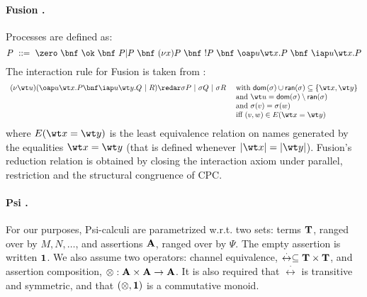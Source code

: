 \documentclass{LMCS}
\begin{document}
\paragraph{Fusion \cite{parrow.victor:fusion-calculus}.}
Processes are defined as:
$$
P\ ::=\ \zero\ \bnf\ \ok \ \bnf \ P|P\ \bnf \ (\nu x)P\ \bnf \ !P\ \bnf \ 
\oap u {\wt x}.P\ \bnf \ \iap u {\wt x}.P 
$$
The interaction rule for Fusion is taken from \cite{WG:explicit-fusions}:
$$
\begin{array}{ll}
(\nu \wt u)(\oap u {\wt x}.P\bnf \iap u {\wt y}.Q\ | \ R)
\redar \sigma P\ | \ \sigma Q\ | \ \sigma R\ 
& \mbox{with } {\sf dom}(\sigma) \cup {\sf ran}(\sigma) \subseteq \{\wt x,\wt y\}
\\
& \mbox{and } \wt u = {\sf dom}(\sigma) \setminus {\sf ran}(\sigma)
\\
& \mbox{and } \sigma(v) = \sigma(w)
\\
& \mbox{iff } (v,w) \in E(\wt x = \wt y)
\end{array}
$$
where $E(\wt x = \wt y)$ is the least equivalence relation on names
generated by the equalities $\wt x = \wt y$ (that is defined 
whenever $|\wt x| = |\wt y|$).
Fusion's reduction relation is obtained by closing the interaction axiom
under parallel, restriction and the structural congruence of CPC.

\newcommand{\cheq}{\stackrel\cdot\leftrightarrow}
\newcommand{\terms}{{\bf T}}
\newcommand{\assertion}{{\bf A}}
\newcommand{\one}{{\bf 1}}
\newcommand{\compose}{\otimes}
\newcommand{\assert}[1]{\llparenthesis \, #1 \, \rrparenthesis}
\newcommand{\fram}[1]{{\cal F}(#1)}

\paragraph{Psi \cite{BJPV11}.}
For our purposes, Psi-calculi are parametrized w.r.t. two sets: terms $\terms$,
ranged over by $M,N,\ldots$, and assertions $\assertion$, ranged over by $\Psi$.
The empty assertion is written $\one$.
We also assume two operators: channel equivalence, $\cheq \subseteq \terms \times \terms$,
and assertion composition, $\compose: \assertion \times \assertion \rightarrow \assertion$. 
It is also required that $\cheq$ is transitive and
symmetric, and that $(\compose,\one)$ is a commutative monoid.
\end{document}
